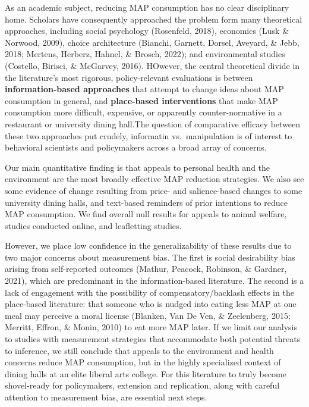 \documentclass[
  man]{apa6}
\begin{document}
As an academic subject, reducing MAP consumption has no clear disciplinary home. Scholars have consequently approached the problem form many theoretical approaches, including social psychology (Rosenfeld, 2018), economics (Lusk \& Norwood, 2009), choice architecture (Bianchi, Garnett, Dorsel, Aveyard, \& Jebb, 2018; Mertens, Herberz, Hahnel, \& Brosch, 2022); and environmental studies (Costello, Birisci, \& McGarvey, 2016). HOwever, the central theoretical divide in the literature's most rigorous, policy-relevant evaluations is between \textbf{information-based approaches} that attempt to change ideas about MAP consumption in general, and \textbf{place-based interventions} that make MAP consumption more difficult, expensive, or apparently counter-normative in a restaurant or university dining hall.The question of comparative efficacy between these two approaches \textemdash put crudely, informatin vs.~manipulation \textemdash is of interest to behavioral scientists and policymakers across a broad array of concerns.

Our main quantitative finding is that appeals to personal health and the environment are the most broadly effective MAP reduction strategies. We also see some evidence of change resulting from price- and salience-based changes to some university dining halls, and text-based reminders of prior intentions to reduce MAP consumption. We find overall null results for appeals to animal welfare, studies conducted online, and leafletting studies.

However, we place low confidence in the generalizability of these results due to two major concerns about measurement bias. The first is social desirability bias arising from self-reported outcomes (Mathur, Peacock, Robinson, \& Gardner, 2021), which are predominant in the information-based literature. The second is a lack of engagement with the possibility of compensatory/backlash effects in the place-based literature: that someone who is nudged into eating less MAP at one meal may perceive a moral license (Blanken, Van De Ven, \& Zeelenberg, 2015; Merritt, Effron, \& Monin, 2010) to eat more MAP later. If we limit our analysis to studies with measurement strategies that accommodate both potential threats to inference, we still conclude that appeals to the environment and health concerns reduce MAP consumption, but in the highly specialized context of dining halls at an elite liberal arts college. For this literature to truly become shovel-ready for policymakers, extension and replication, along with careful attention to measurement bias, are essential next steps.
\end{document}
